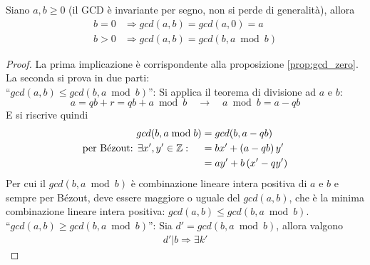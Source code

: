 \begin{theorem} [Euclide]
    \label{teo:euclide}
    Siano $a,b \geq 0$ (il GCD è invariante per segno, non si perde di generalità), allora
    \begin{align*}
        b=0
        &
        \Rightarrow
        gcd(a,b) =
        gcd(a,0) = a
        \\
        b>0
        &
        \Rightarrow
        gcd(a,b) =
        gcd(b,
            a \bmod b
        )
    \end{align*}
    \begin{proof}
        La prima implicazione è corrispondente alla proposizione \ref{prop:gcd_zero}.
        \\
        La seconda si prova in due parti:
        \\
        ``$ gcd(a,b) \leq gcd(b, a \bmod b) $'':
        Si applica il teorema di divisione ad $a$ e $b$:
        \begin{equation*}
            a = qb + r = qb + a \bmod b
            \quad
            \rightarrow
            \quad
            a \bmod b = a - qb
        \end{equation*}
        E si riscrive quindi
        \begin{align*}
            gcd(b, a \bmod b)
            &= 
            gcd(b, a - qb)
            \\
            \text{per Bézout:
            $ \exists x', y' \in \mathbb{Z} : $
            }
            \quad
            &
            =
            b x' + 
            \left( 
                a - qb
            \right) y'
            \\
            &= 
            a y'
            +
            b
            \left( 
                x' - qy'
            \right)
        \end{align*}
        Per cui il $
        gcd(b, a \bmod b)
        $ è combinazione lineare intera positiva di $a$ e $b$ e sempre per Bézout, deve essere maggiore o uguale del $
        gcd(a, b)
        $, che è la minima combinazione lineare intera positiva:
        $ gcd(a,b) \leq gcd(b, a \bmod b) $.
        \\
        ``$ gcd(a,b) \geq gcd(b, a \bmod b) $'':
        Sia $
        d' = gcd(b, a \bmod b)
        $, allora valgono
        \begin{align*}
            d' | b 
            \Rightarrow
            \exists k' 

\end{align*}
\end{proof}
\end{theorem}
